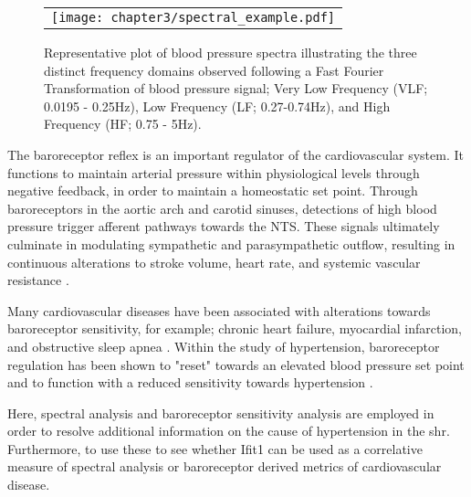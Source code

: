 \begin{figure*}[!hbtp]
\centering
\begin{tabular}{c}
  \texttt{[image: chapter3/spectral\_example.pdf]}
\end{tabular}
\caption[Representative plot of blood pressure spectra]{Representative plot of blood pressure spectra illustrating the three distinct frequency domains observed following a Fast Fourier Transformation of blood pressure signal; Very Low Frequency (VLF; 0.0195 - 0.25Hz), Low Frequency (LF; 0.27-0.74Hz), and High Frequency (HF; 0.75 - 5Hz).}
\label{fig:spectral}
\end{figure*}

The baroreceptor reflex is an important regulator of the cardiovascular system. It functions to maintain arterial pressure within physiological levels through negative feedback, in order to maintain a homeostatic set point. Through baroreceptors in the aortic arch and carotid sinuses, detections of high blood pressure trigger afferent pathways towards the NTS. These signals ultimately culminate in modulating sympathetic and parasympathetic outflow, resulting in continuous alterations to stroke volume, heart rate, and systemic vascular resistance \cite{Chopra2011}.

Many cardiovascular diseases have been associated with alterations towards baroreceptor sensitivity, for example; chronic heart failure, myocardial infarction, and obstructive sleep apnea \cite{Andrea1997,Ryan2007,LaRovere2001}. Within the study of hypertension, baroreceptor regulation has been shown to "reset" towards an elevated blood pressure set point and to function with a reduced sensitivity towards hypertension \cite{Mussalo2002}. 

Here, spectral analysis and baroreceptor sensitivity analysis are employed in order to resolve additional information on the cause of hypertension in the \acrshort{shr}. Furthermore, to use these to see whether Ifit1 can be used as a correlative measure of spectral analysis or baroreceptor derived metrics of cardiovascular disease. 

